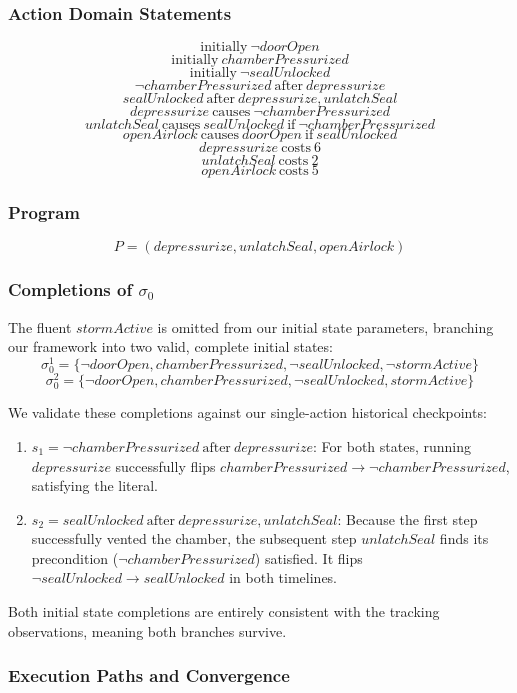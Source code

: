 \documentclass[11pt]{article}
\newcommand{\parr}{\par\vspace{5mm}\noindent}
\begin{document}
\subsubsection{Action Domain Statements}
\[
\text{initially}~ \neg doorOpen
\]
\[
\text{initially}~ chamberPressurized
\]
\[
\text{initially}~ \neg sealUnlocked
\]
\[
\neg chamberPressurized ~\text{after}~ depressurize
\]
\[
sealUnlocked ~\text{after}~ depressurize, unlatchSeal
\]
\[
depressurize ~\text{causes}~ \neg chamberPressurized
\]
\[
unlatchSeal ~\text{causes}~ sealUnlocked ~\text{if}~ \neg chamberPressurized
\]
\[
openAirlock ~\text{causes}~ doorOpen ~\text{if}~ sealUnlocked
\]
\[
depressurize ~\text{costs}~ 6
\]
\[
unlatchSeal ~\text{costs}~ 2
\]
\[
openAirlock ~\text{costs}~ 5
\]

\subsubsection{Program}
\[
P = (depressurize, unlatchSeal, openAirlock)
\]

\subsubsection{Completions of $\sigma_0$}
The fluent $stormActive$ is omitted from our initial state parameters, branching our framework into two valid, complete initial states:
\[
\sigma_0^1 = \{\neg doorOpen, chamberPressurized, \neg sealUnlocked, \neg stormActive\}
\]
\[
\sigma_0^2 = \{\neg doorOpen, chamberPressurized, \neg sealUnlocked, stormActive\}
\]

\parr
We validate these completions against our single-action historical checkpoints:
\begin{enumerate}
    \item $s_1 = \neg chamberPressurized ~\text{after}~ depressurize$: For both states, running $depressurize$ successfully flips $chamberPressurized \rightarrow \neg chamberPressurized$, satisfying the literal.
    \item $s_2 = sealUnlocked ~\text{after}~ depressurize, unlatchSeal$: Because the first step successfully vented the chamber, the subsequent step $unlatchSeal$ finds its precondition ($\neg chamberPressurized$) satisfied. It flips $\neg sealUnlocked \rightarrow sealUnlocked$ in both timelines.
\end{enumerate}
Both initial state completions are entirely consistent with the tracking observations, meaning both branches survive.

\subsubsection{Execution Paths and Convergence}
\end{document}

